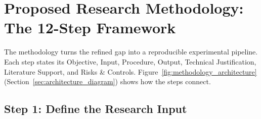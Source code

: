 \documentclass[11pt,a4paper]{article}
\begin{document}
\section{Proposed Research Methodology: The 12-Step Framework}
\label{sec:methodology}

The methodology turns the refined gap into a reproducible experimental pipeline. Each step states its Objective, Input, Procedure, Output, Technical Justification, Literature Support, and Risks \& Controls. Figure~\ref{fig:methodology_architecture} (Section~\ref{sec:architecture_diagram}) shows how the steps connect.

\subsection{Step 1: Define the Research Input}
\end{document}
